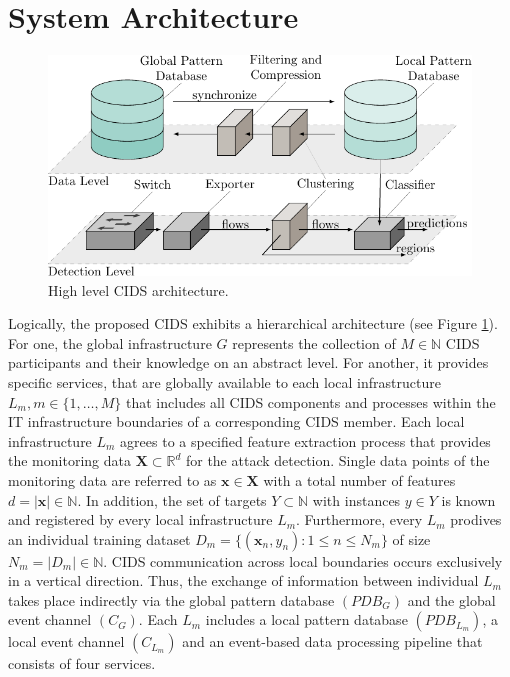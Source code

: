 \section{System Architecture} \label{sec:system_architecture}



\begin{figure}[b!]
    \centering
    \includegraphics[width=1\linewidth]{tikz/high_level_architecture.pdf}
    \caption{High level CIDS architecture.}
    \label{fig:high_level_architecture}
    \end{figure}

    
    Logically, the proposed CIDS exhibits a hierarchical architecture (see Figure \ref{fig:high_level_architecture}). For one, the global infrastructure $G$ represents the collection of $M \in \mathbb{N}$ CIDS participants and their knowledge on an abstract level. For another, it provides specific services, that are globally available to each local infrastructure $L_m, m \in \{1, \dots, M\}$ that includes all CIDS components and processes within the IT infrastructure boundaries of a corresponding CIDS member. Each local infrastructure $L_m$ agrees to a specified feature extraction process that provides the monitoring data $\bm{X} \subset \mathbb{R}^d$ for the attack detection. Single data points of the monitoring data are referred to as $\bm{x} \in \bm{X}$ with a total number of features $d = |\bm{x}| \in \mathbb{N}$. In addition, the set of targets $Y \subset \mathbb{N}$ with instances $y \in Y$ is known and registered by every local infrastructure $L_m$. Furthermore, every $L_m$ prodives an individual training dataset $D_m= \{(\bm{x}_n, y_n): 1 \leq n \leq N_m\}$ of size $N_m = |D_m| \in \mathbb{N}$. CIDS communication across local boundaries occurs exclusively in a vertical direction. Thus, the exchange of information between individual $L_m$ takes place indirectly via the global pattern database $(PDB_G)$ and the global event channel $(C_G)$. Each $L_m$ includes a local pattern database $(PDB_{L_m})$, a local event channel $(C_{L_m})$ and an event-based data processing pipeline that consists of four services.

